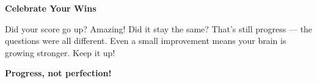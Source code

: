 {\begin{tcolorbox}[
    enhanced,
    colback=funGreenLight,
    colframe=funGreen!50,
    arc=10pt,
    boxrule=1pt,
    left=6mm, right=6mm, top=4mm, bottom=4mm,
]
{\bfseries\color{funGreenDark} \faThumbsUp\hspace{2mm}Celebrate Your Wins}

\vspace{2mm}

Did your score go up? Amazing! Did it stay the same? That's still progress — the questions were all different. Even a small improvement means your brain is growing stronger. Keep it up!
\end{tcolorbox}

\vspace{4mm}

\begin{center}
{\large\bfseries\color{funPurpleDark} \faStar\hspace{2mm}Progress, not perfection!\hspace{2mm}\faStar}
\end{center}

}
\newpage
